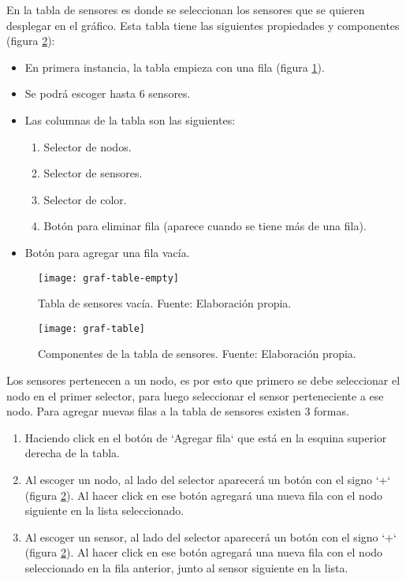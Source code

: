 En la tabla de sensores es donde se seleccionan los sensores que se quieren desplegar en el gráfico. Esta tabla tiene las siguientes propiedades y componentes (figura \ref{fig:graf-table}):
\begin{itemize}
    \item En primera instancia, la tabla empieza con una fila (figura \ref{fig:graf-table-empty}).
    \item Se podrá escoger hasta 6 sensores.
    \item Las columnas de la tabla son las siguientes:
          \begin{enumerate}
              \item Selector de nodos.
              \item Selector de sensores.
              \item Selector de color.
              \item Botón para eliminar fila (aparece cuando se tiene más de una fila).
          \end{enumerate}
    \item Botón para agregar una fila vacía.
\end{itemize}

\begin{figure}[H]
	\centering
	\texttt{[image: graf-table-empty]}
	\caption{\label{fig:graf-table-empty} Tabla de sensores vacía. Fuente: Elaboración propia.}
\end{figure}

\begin{figure}[H]
	\centering
	\texttt{[image: graf-table]}
	\caption{\label{fig:graf-table} Componentes de la tabla de sensores. Fuente: Elaboración propia.}
\end{figure}

Los sensores pertenecen a un nodo, es por esto que primero se debe seleccionar el nodo en el primer selector, para luego seleccionar el sensor perteneciente a ese nodo.
Para agregar nuevas filas a la tabla de sensores existen 3 formas.
\begin{enumerate}
    \item Haciendo click en el botón de `Agregar fila` que está en la esquina superior derecha de la tabla.
    \item Al escoger un nodo, al lado del selector aparecerá un botón con el signo `+` (figura \ref{fig:graf-table}). Al hacer click en ese botón agregará una nueva fila con el nodo siguiente en la lista seleccionado.
    \item Al escoger un sensor, al lado del selector aparecerá un botón con el signo `+` (figura \ref{fig:graf-table}). Al hacer click en ese botón agregará una nueva fila con el nodo seleccionado en la fila anterior, junto al sensor siguiente en la lista.
\end{enumerate}

